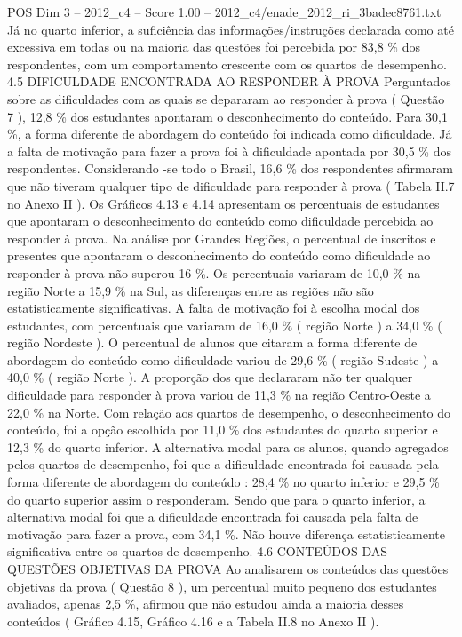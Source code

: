 \begin{textsample}{POS Dim 3 – 2012\_c4 – Score 1.00 – 2012\_c4/enade\_2012\_ri\_3badec8761.txt}
Já no quarto inferior, a suficiência das informações/instruções declarada como até excessiva em todas ou na maioria das questões foi percebida por 83,8 \% dos respondentes, com um comportamento crescente com os quartos de desempenho. 4.5 DIFICULDADE ENCONTRADA AO RESPONDER À PROVA Perguntados sobre as dificuldades com as quais se depararam ao responder à prova ( Questão 7 ), 12,8 \% dos estudantes apontaram o desconhecimento do conteúdo.
Para 30,1 \%, a forma diferente de abordagem do conteúdo foi indicada como dificuldade.
Já a falta de motivação para fazer a prova foi à dificuldade apontada por 30,5 \% dos respondentes.
Considerando -se todo o Brasil, 16,6 \% dos respondentes afirmaram que não tiveram qualquer tipo de dificuldade para responder à prova ( Tabela II.7 no Anexo II ).
Os Gráficos 4.13 e 4.14 apresentam os percentuais de estudantes que apontaram o desconhecimento do conteúdo como dificuldade percebida ao responder à prova.
Na análise por Grandes Regiões, o percentual de inscritos e presentes que apontaram o desconhecimento do conteúdo como dificuldade ao responder à prova não superou 16 \%.
Os percentuais variaram de 10,0 \% na região Norte a 15,9 \% na Sul, as diferenças entre as regiões não são estatisticamente significativas.
A falta de motivação foi à escolha modal dos estudantes, com percentuais que variaram de 16,0 \% ( região Norte ) a 34,0 \% ( região Nordeste ).
O percentual de alunos que citaram a forma diferente de abordagem do conteúdo como dificuldade variou de 29,6 \% ( região Sudeste ) a 40,0 \% ( região Norte ).
A proporção dos que declararam não ter qualquer dificuldade para responder à prova variou de 11,3 \% na região Centro-Oeste a 22,0 \% na Norte.
Com relação aos quartos de desempenho, o desconhecimento do conteúdo, foi a opção escolhida por 11,0 \% dos estudantes do quarto superior e 12,3 \% do quarto inferior.
A alternativa modal para os alunos, quando agregados pelos quartos de desempenho, foi que a dificuldade encontrada foi causada pela forma diferente de abordagem do conteúdo : 28,4 \% no quarto inferior e 29,5 \% do quarto superior assim o responderam.
Sendo que para o quarto inferior, a alternativa modal foi que a dificuldade encontrada foi causada pela falta de motivação para fazer a prova, com 34,1 \%.
Não houve diferença estatisticamente significativa entre os quartos de desempenho. 4.6 CONTEÚDOS DAS QUESTÕES OBJETIVAS DA PROVA Ao analisarem os conteúdos das questões objetivas da prova ( Questão 8 ), um percentual muito pequeno dos estudantes avaliados, apenas 2,5 \%, afirmou que não estudou ainda a maioria desses conteúdos ( Gráfico 4.15, Gráfico 4.16 e a Tabela II.8 no Anexo II ).

\end{textsample}

